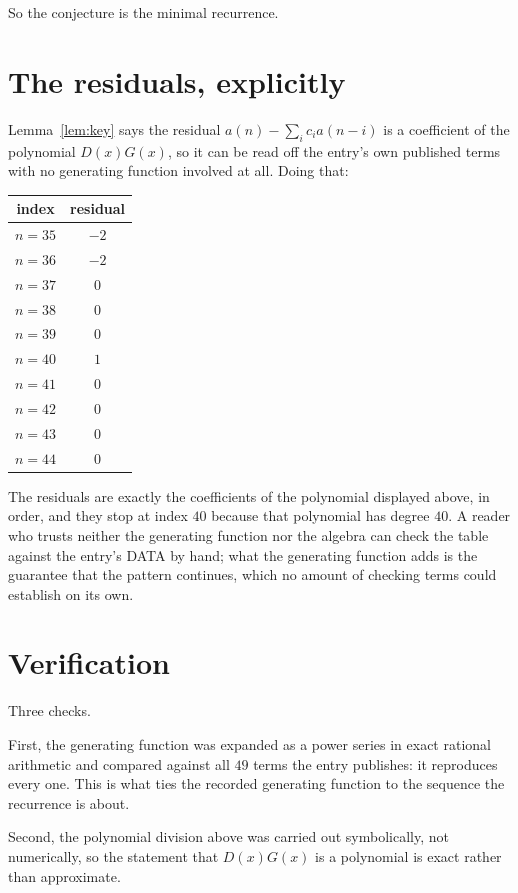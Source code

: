 \documentclass[11pt,a4paper]{article}
\theoremstyle{plain}
\theoremstyle{definition}
\begin{document}
So the conjecture is the minimal recurrence.

\section{The residuals, explicitly}

Lemma~\ref{lem:key} says the residual $a(n)-\sum_ic_ia(n-i)$ is a coefficient of the
polynomial $D(x)G(x)$, so it can be read off the entry's own published terms with no
generating function involved at all. Doing that:
\begin{center}
\begin{tabular}{cc}
index & residual \\ \hline
$n=35$ & $-2$ \\
$n=36$ & $-2$ \\
$n=37$ & $0$ \\
$n=38$ & $0$ \\
$n=39$ & $0$ \\
$n=40$ & $1$ \\
$n=41$ & $0$ \\
$n=42$ & $0$ \\
$n=43$ & $0$ \\
$n=44$ & $0$
\end{tabular}
\end{center}
The residuals are exactly the coefficients of the polynomial displayed above, in order, and
they stop at index $40$ because that polynomial has degree $40$. A reader who trusts
neither the generating function nor the algebra can check the table against the entry's DATA
by hand; what the generating function adds is the guarantee that the pattern continues, which
no amount of checking terms could establish on its own.

\section{Verification}

Three checks.

First, the generating function was expanded as a power series in exact rational arithmetic and
compared against all $49$ terms the entry publishes: it reproduces every one. This is
what ties the recorded generating function to the sequence the recurrence is about.

Second, the polynomial division above was carried out symbolically, not numerically, so the
statement that $D(x)G(x)$ is a polynomial is exact rather than approximate.
\end{document}
